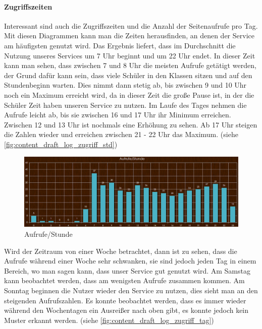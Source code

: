 \paragraph{Zugriffszeiten\\}
Interessant sind auch die Zugriffszeiten und die Anzahl der Seitenaufrufe pro Tag.\\
Mit diesen Diagrammen kann man die Zeiten herausfinden, an denen der Service am häufigsten genutzt wird. Das Ergebnis liefert, dass im Durchschnitt die Nutzung unseres Services um 7 Uhr beginnt und um 22 Uhr endet. In dieser Zeit kann man sehen, dass zwischen 7 und 8 Uhr die meisten Aufrufe getätigt werden, der Grund dafür kann sein, dass viele Schüler in den Klassen sitzen und auf den Stundenbeginn warten. Dies nimmt dann stetig ab, bis zwischen 9 und 10 Uhr noch ein Maximum erreicht wird, da in dieser Zeit die große Pause ist, in der die Schüler Zeit haben unseren Service zu nutzen. Im Laufe des Tages nehmen die Aufrufe leicht ab, bis sie zwischen 16 und 17 Uhr ihr Minimum erreichen. Zwischen 12 und 13 Uhr ist nochmals eine Erhöhung zu sehen. Ab 17 Uhr steigen die Zahlen wieder und erreichen zwischen 21 - 22 Uhr das Maximum. (siehe \autoref{fig:content_draft_log_zugriff_std})

\begin{figure}[H]
\centering
\includegraphics[keepaspectratio=true, width=17cm]{images/screenshots/statistics/aufruf_std.png}
\caption{Aufrufe/Stunde}
\label{fig:content_draft_log_zugriff_std}
\end{figure}

Wird der Zeitraum von einer Woche betrachtet, dann ist zu sehen, dass die Aufrufe während einer Woche sehr schwanken, sie sind jedoch jeden Tag in einem Bereich, wo man sagen kann, dass unser Service gut genutzt wird. Am Samstag kann beobachtet werden, dass am wenigsten Aufrufe zusammen kommen. Am Sonntag beginnen die Nutzer wieder den Service zu nutzen, dies sieht man an den steigenden Aufrufszahlen. Es konnte beobachtet werden, dass es immer wieder während den Wochentagen ein Ausreißer nach oben gibt, es konnte jedoch kein Muster erkannt werden. (siehe \autoref{fig:content_draft_log_zugriff_tag})


